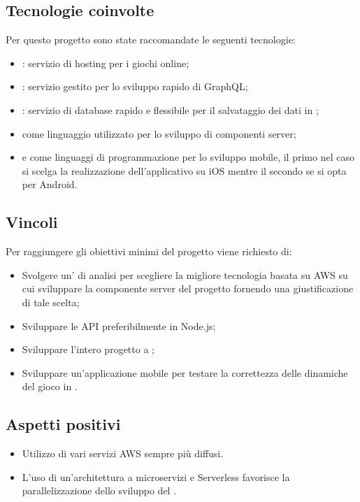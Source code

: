 \subsection{Tecnologie coinvolte}
Per questo progetto sono state raccomandate le seguenti tecnologie:
\begin{itemize}
	\item {}: servizio di hosting per i giochi online;
	\item {}: servizio gestito per lo sviluppo rapido di  GraphQL;
	\item {}: servizio di database  rapido e flessibile per il salvataggio dei dati in ;
	\item {} come linguaggio utilizzato per lo sviluppo di componenti server;
	\item {} e  come linguaggi di programmazione per lo sviluppo mobile, il primo nel caso si scelga la realizzazione dell'applicativo su iOS mentre il secondo se si opta per Android.
\end{itemize}

\subsection{Vincoli}
Per raggiungere gli obiettivi minimi del progetto viene richiesto di:
\begin{itemize}
	\item Svolgere un' di analisi per scegliere la migliore tecnologia basata su AWS su cui sviluppare la componente server del progetto fornendo una giustificazione di tale scelta;
	\item Sviluppare le API preferibilmente in Node.js;
	\item Sviluppare l'intero progetto a ;
	\item Sviluppare un'applicazione mobile per testare la correttezza delle dinamiche del gioco in .
\end{itemize}

 \subsection{Aspetti positivi}
\begin{itemize}
	\item Utilizzo di vari servizi AWS sempre più diffusi.
	\item L'uso di un'architettura a microservizi e Serverless favorisce la parallelizzazione dello sviluppo del .
\end{itemize}

